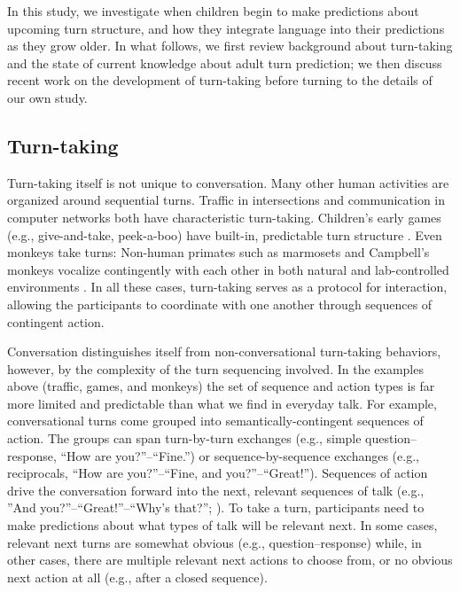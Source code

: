 \documentclass[authoryear, 12pt]{elsarticle}
\begin{document}
In this study, we investigate when children begin to make predictions about upcoming turn structure, and how they integrate language into their predictions as they grow older. In what follows, we first review background about turn-taking and the state of current knowledge about adult turn prediction; we then discuss recent work on the development of turn-taking before turning to the details of our own study.



\subsection{Turn-taking}

Turn-taking itself is not unique to conversation. Many other human activities are organized around sequential turns. Traffic in intersections and communication in computer networks both have characteristic turn-taking. Children's early games (e.g., give-and-take, peek-a-boo) have built-in, predictable turn structure \citep{ratner1978, ross1987}. Even monkeys take turns: Non-human primates such as marmosets and Campbell's monkeys vocalize contingently with each other in both natural and lab-controlled environments \citep{lemasson2011, takahashi2013}. In all these cases, turn-taking serves as a protocol for interaction, allowing the participants to coordinate with one another through sequences of contingent action. 

Conversation distinguishes itself from non-conversational turn-taking behaviors, however, by the complexity of the turn sequencing involved. In the examples above (traffic, games, and monkeys) the set of sequence and action types is far more limited and predictable than what we find in everyday talk. For example, conversational turns come grouped into semantically-contingent sequences of action. The groups can span turn-by-turn exchanges (e.g., simple question--response, ``How are you?''--``Fine.'') or sequence-by-sequence exchanges (e.g., reciprocals, ``How are you?''--``Fine, and you?''--``Great!''). Sequences of action drive the conversation forward into the next, relevant sequences of talk (e.g., ''And you?''--``Great!''--``Why's that?''; \citealp{schegloff2007}). To take a turn, participants need to make predictions about what types of talk will be relevant next. In some cases, relevant next turns are somewhat obvious (e.g., question--response) while, in other cases, there are multiple relevant next actions to choose from, or no obvious next action at all (e.g., after a closed sequence).
\end{document}

